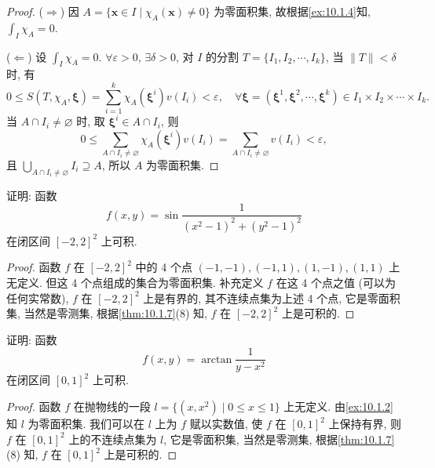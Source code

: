 \begin{proof}
($\Rightarrow$) 因 $A = \{\boldsymbol{x} \in I \mid \chi_{A}(\boldsymbol{x}) \neq 0\}$ 为零面积集, 故根据\cref{ex:10.1.4}知, $\displaystyle\int_{I} \chi_{A} = 0$.

($\Leftarrow$) 设 $\displaystyle\int_{I} \chi_{A} = 0$. $\forall \varepsilon > 0$, $\exists \delta > 0$, 对 $I$ 的分割 $T = \{I_{1}, I_{2}, \cdots, I_{k}\}$, 当 $\|T\| < \delta$ 时, 有
\[
  0 \leqslant S(T, \chi_{A}, \boldsymbol{\xi}) = \sum_{i=1}^{k} \chi_{A}(\boldsymbol{\xi}^{i}) v(I_{i}) < \varepsilon, \quad \forall \boldsymbol{\xi} = (\boldsymbol{\xi}^{1}, \boldsymbol{\xi}^{2}, \cdots, \boldsymbol{\xi}^{k}) \in I_{1} \times I_{2} \times \cdots \times I_{k}.
\]
当 $A \cap I_i \neq \varnothing$ 时, 取 $\boldsymbol{\xi}^i \in A \cap I_i$, 则
\[
  0 \leqslant \sum_{A \cap I_{i} \neq \varnothing} \chi_{A}(\boldsymbol{\xi}^{i}) v(I_{i}) = \sum_{A \cap I_{i} \neq \varnothing} v(I_{i}) < \varepsilon,
\]
且 $\bigcup\limits_{A \cap I_{i} \neq \varnothing} I_{i} \supseteq A$, 所以 $A$ 为零面积集.
\end{proof}

\begin{example}\label{ex:10.1.7}
证明: 函数
\[
  f(x, y) = \sin\frac{1}{(x^{2}-1)^{2}+(y^{2}-1)^{2}}
\]
在闭区间 $[-2, 2]^{2}$ 上可积.
\end{example}

\begin{proof}
函数 $f$ 在 $[-2, 2]^{2}$ 中的 4 个点 $(-1, -1), (-1, 1), (1, -1), (1, 1)$ 上无定义. 但这 4 个点组成的集合为零面积集. 补充定义 $f$ 在这 4 个点之值 (可以为任何实常数), $f$ 在 $[-2, 2]^{2}$ 上是有界的, 其不连续点集为上述 4 个点, 它是零面积集, 当然是零测集, 根据\cref{thm:10.1.7}(8) 知, $f$ 在 $[-2, 2]^{2}$ 上是可积的.
\end{proof}

\begin{example}\label{ex:10.1.8}
证明: 函数
\[
  f(x, y) = \arctan\frac{1}{y - x^{2}}
\]
在闭区间 $[0, 1]^{2}$ 上可积.
\end{example}

\begin{proof}
函数 $f$ 在抛物线的一段 $l = \{(x, x^{2}) \mid 0 \leqslant x \leqslant 1\}$ 上无定义. 由\cref{ex:10.1.2}知 $l$ 为零面积集. 我们可以在 $l$ 上为 $f$ 赋以实数值, 使 $f$ 在 $[0, 1]^{2}$ 上保持有界, 则 $f$ 在 $[0, 1]^{2}$ 上的不连续点集为 $l$, 它是零面积集, 当然是零测集, 根据\cref{thm:10.1.7}(8) 知, $f$ 在 $[0, 1]^{2}$ 上是可积的.
\end{proof}

